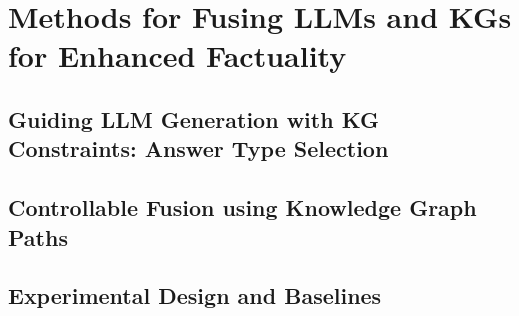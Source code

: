 \chapter{Methods for Fusing LLMs and KGs for Enhanced Factuality}
\label{chap:methods}


\section{Guiding LLM Generation with KG Constraints: Answer Type Selection}
\label{sec:methods_type_selection}


\section{Controllable Fusion using Knowledge Graph Paths}
\label{sec:methods_kg_path_fusion}


\section{Experimental Design and Baselines}
\label{sec:methods_experimental_design}


